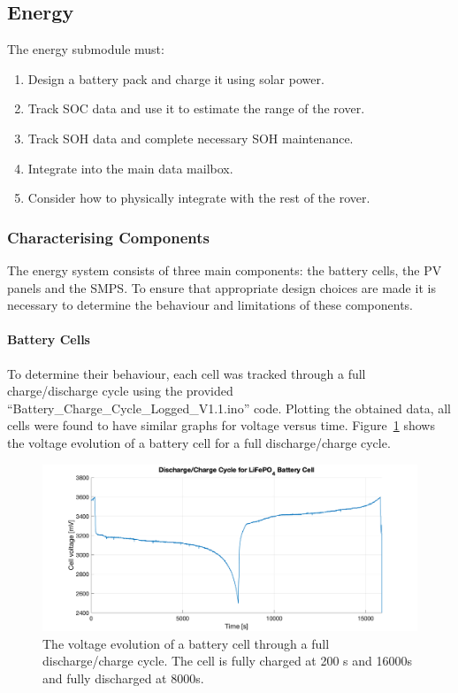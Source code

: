 \documentclass[a4paper]{article}
\begin{document}
\subsection{Energy}

The energy submodule must:
\begin{enumerate}
    \item Design a battery pack and charge it using solar power.
    \item Track SOC data and use it to estimate the range of the rover.
    \item Track SOH data and complete necessary SOH maintenance.
    \item Integrate into the main data mailbox.
    \item Consider how to physically integrate with the rest of the rover.
\end{enumerate}

\subsubsection{Characterising Components}
The energy system consists of three main components: the battery cells, the 
PV panels and the SMPS. To ensure that appropriate design choices are made 
it is necessary to determine the behaviour and limitations of these components.

\paragraph*{Battery Cells}
To determine their behaviour, each cell was tracked through a full charge/discharge 
cycle using the provided “Battery\_Charge\_Cycle\_Logged\_V1.1.ino” 
code\cite{chargeCode}. Plotting the obtained data, all cells were found to 
have similar graphs for voltage versus time. Figure~\ref{fig:charge_cycle} 
shows the voltage evolution of a battery cell for a full discharge/charge cycle.

\begin{figure}[H]
    \centering
    \includegraphics[scale=0.22]{Charge_Cycle2.png}
    \caption{The voltage evolution of a battery cell through a full discharge/charge cycle. The
    cell is fully charged at 200 s and 16000s and fully discharged at 8000s.}
    \label{fig:charge_cycle}
\end{figure}
\end{document}
